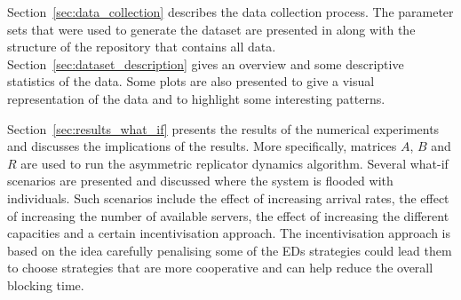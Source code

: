 Section~\ref{sec:data_collection} describes the data collection process.
The parameter sets that were used to generate the dataset are presented in
along with the structure of the repository that contains all data.
Section~\ref{sec:dataset_description} gives an overview and some descriptive
statistics of the data.
Some plots are also presented to give a visual representation of the data and
to highlight some interesting patterns.

Section~\ref{sec:results_what_if} presents the results of the numerical
experiments and discusses the implications of the results.
More specifically, matrices \(A\), \(B\) and \(R\) are used to run the
asymmetric replicator dynamics algorithm.
Several what-if scenarios are presented and discussed where the system is
flooded with individuals.
Such scenarios include the effect of increasing arrival rates, the effect of
increasing the number of available servers, the effect of increasing the
different capacities and a certain incentivisation approach.
The incentivisation approach is based on the idea carefully penalising some of
the EDs strategies could lead them to choose strategies that are more
cooperative and can help reduce the overall blocking time.
